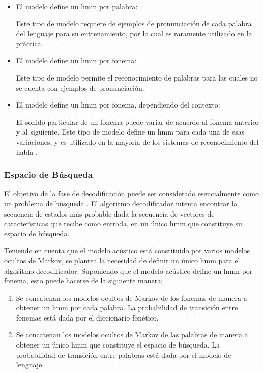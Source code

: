 \begin{itemize}
 	\item El modelo define un \gls{hmm} por palabra:


 		Este tipo de modelo requiere de ejemplos de pronunciaci\'on de cada palabra del lenguaje para 
 		su entrenamiento, por lo cual es raramente utilizado en la pr\'actica.
 	\item El modelo define un \gls{hmm} por fonema:


 		Este tipo de modelo permite el reconocimiento
 		de palabras para las cuales no se cuenta con ejemplos de pronunciaci\'on.
 	\item El modelo define un \gls{hmm} por fonema, dependiendo del contexto:


 		El sonido particular de un fonema puede variar de acuerdo al fonema anterior y al siguiente.
 		Este tipo de modelo define un \gls{hmm} para cada una de esas variaciones, y es utilizado
 		en la mayor{\'\i}a de los sistemas de reconocimiento del habla \cite{Odell95theuse}.
 \end{itemize}  

\subsubsection{Espacio de B\'usqueda}
El objetivo de la fase de decodificaci\'on puede ser considerado esencialmente como un problema de 
b\'usqueda \cite{huang-handbook10}.
El algoritmo decodificador intenta encontrar la secuencia de estados m\'as probable dada la secuencia de
vectores de caracter{\'\i}sticas que recibe como entrada, en un \'unico \gls{hmm} que constituye su espacio de b\'usqueda.

Teniendo en cuenta que el modelo ac\'ustico est\'a constituido por varios modelos ocultos de Markov, se plantea
la necesidad de definir un \'unico \gls{hmm} para el algoritmo decodificador. Suponiendo que el modelo ac\'ustico define
un \gls{hmm} por fonema, esto puede hacerse de la siguiente manera:

\begin{enumerate}
	\item Se concatenan los modelos ocultos de Markov de los fonemas de manera a obtener un \gls{hmm} por cada palabra. 
	La probabilidad de transici\'on entre fonemas est\'a dada por el diccionario fon\'etico.
	\item Se concatenan los modelos ocultos de Markov de las palabras de manera a obtener un \'unico \gls{hmm} que
	constituye el espacio de b\'usqueda. La probabilidad de transici\'on entre palabras est\'a dada por el modelo
	de lenguaje.
\end{enumerate}

